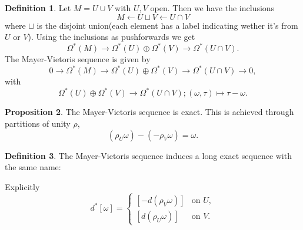 \documentclass[twocolumn]{article}
\theoremstyle{definition}
\newtheorem{definition}{Definition}[section]
\newtheorem{proposition}[definition]{Proposition}
\theoremstyle{remark}
\begin{document}
\begin{definition}
    Let $M = U \cup V$ with $U, V$ open. Then we have the inclusions
    \begin{equation}
        M \leftarrow U \sqcup V \leftarrow U \cap V
    \end{equation}
    where $\sqcup$ is the disjoint union(each element has a label indicating wether it's from $U$ or $V$).
    Using the inclusions as pushforwards we get
    \begin{equation}
        \Omega^*(M) \rightarrow \Omega^*(U) \oplus \Omega^*(V) \rightarrow \Omega^*(U \cap V).
    \end{equation}
    The Mayer-Vietoris sequence is given by
    \begin{equation}
        0 \rightarrow \Omega^*(M) \rightarrow \Omega^*(U) \oplus \Omega^*(V) \rightarrow \Omega^*(U \cap V) \rightarrow 0,
    \end{equation}
    with
    \begin{equation}
        \Omega^*(U) \oplus \Omega^*(V) \rightarrow \Omega^*(U \cap V); (\omega, \tau) \mapsto \tau - \omega.
    \end{equation}
\end{definition}
\begin{proposition}
    The Mayer-Vietoris sequence is exact. This is achieved through partitions of unity $\rho$,
    \begin{equation}
        (\rho_U \omega) - (-\rho_V \omega) = \omega.
    \end{equation}
\end{proposition}
\begin{definition}
    The Mayer-Vietoris sequence induces a long exact sequence with the same name:
    \begin{center}
    \end{center}
    Explicitly
    \begin{equation}
        d^*[\omega] = 
        \begin{cases}
            [-d(\rho_V\omega)] & \textrm{on } U,\\
            [d(\rho_U\omega)] & \textrm{on } V.
        \end{cases}
    \end{equation}
\end{definition}
\end{document}
